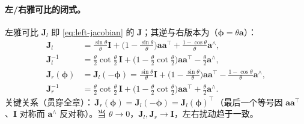 \paragraph{左/右雅可比的闭式。}左雅可比 $\mathbf{J}_l$ 即 \cref{eq:left-jacobian} 的 $\mathbf{J}$；其逆与右版本为（$\boldsymbol{\phi}=\theta\mathbf{a}$）：
\begin{align}
  \mathbf{J}_l &= \frac{\sin\theta}{\theta}\mathbf{I}+\Big(1-\frac{\sin\theta}{\theta}\Big)\mathbf{a}\mathbf{a}^\top+\frac{1-\cos\theta}{\theta}\mathbf{a}^\wedge,\label{eq:Jl}\\
  \mathbf{J}_l^{-1} &= \frac{\theta}{2}\cot\frac{\theta}{2}\,\mathbf{I}+\Big(1-\frac{\theta}{2}\cot\frac{\theta}{2}\Big)\mathbf{a}\mathbf{a}^\top-\frac{\theta}{2}\mathbf{a}^\wedge,\\
  \mathbf{J}_r(\boldsymbol{\phi}) &= \mathbf{J}_l(-\boldsymbol{\phi})=\frac{\sin\theta}{\theta}\mathbf{I}+\Big(1-\frac{\sin\theta}{\theta}\Big)\mathbf{a}\mathbf{a}^\top-\frac{1-\cos\theta}{\theta}\mathbf{a}^\wedge,\label{eq:Jr}\\
  \mathbf{J}_r^{-1} &= \frac{\theta}{2}\cot\frac{\theta}{2}\,\mathbf{I}+\Big(1-\frac{\theta}{2}\cot\frac{\theta}{2}\Big)\mathbf{a}\mathbf{a}^\top+\frac{\theta}{2}\mathbf{a}^\wedge.
\end{align}
关键关系（贯穿全章）：$\boxed{\,\mathbf{J}_r(\boldsymbol{\phi})=\mathbf{J}_l(-\boldsymbol{\phi})=\mathbf{J}_l(\boldsymbol{\phi})^\top\,}$（最后一个等号因 $\mathbf{a}\mathbf{a}^\top$、$\mathbf{I}$ 对称而 $\mathbf{a}^\wedge$ 反对称）。当 $\theta\to0$，$\mathbf{J}_l,\mathbf{J}_r\to\mathbf{I}$，左右扰动趋于一致。

